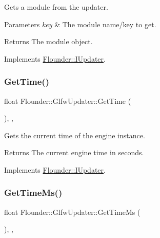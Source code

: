 Gets a module from the updater. 


\begin{DoxyParams}{Parameters}
{\em key} & The module name/key to get. \\
\hline
\end{DoxyParams}
\begin{DoxyReturn}{Returns}
The module object. 
\end{DoxyReturn}


Implements \hyperlink{class_flounder_1_1_i_updater_a074668562d355a9130c2048b32a8f422}{Flounder\+::\+I\+Updater}.

\mbox{\label{class_flounder_1_1_glfw_updater_aa137ad553810d231b78ba0767dd4c743}} 
\subsubsection{\texorpdfstring{Get\+Time()}{GetTime()}}
{\footnotesize\ttfamily float Flounder\+::\+Glfw\+Updater\+::\+Get\+Time (\begin{DoxyParamCaption}{ }\end{DoxyParamCaption})\hspace{0.3cm}{\ttfamily [inline]}, {\ttfamily [override]}, {\ttfamily [virtual]}}



Gets the current time of the engine instance. 

\begin{DoxyReturn}{Returns}
The current engine time in seconds. 
\end{DoxyReturn}


Implements \hyperlink{class_flounder_1_1_i_updater_a2a3f3c2a0308eea36414d51242206a3e}{Flounder\+::\+I\+Updater}.

\mbox{\label{class_flounder_1_1_glfw_updater_aab04afa141bf3837a25159746919e2df}} 
\subsubsection{\texorpdfstring{Get\+Time\+Ms()}{GetTimeMs()}}
{\footnotesize\ttfamily float Flounder\+::\+Glfw\+Updater\+::\+Get\+Time\+Ms (\begin{DoxyParamCaption}{ }\end{DoxyParamCaption})\hspace{0.3cm}{\ttfamily [inline]}, {\ttfamily [override]}, {\ttfamily [virtual]}}



